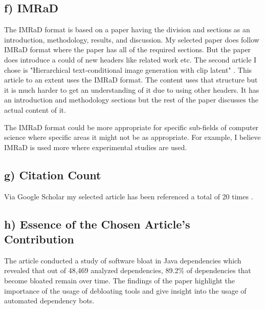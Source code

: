 \documentclass{article}
\begin{document}
\subsection*{f) IMRaD }

The IMRaD format is based on a paper having the division and sections as an introduction, methodology, results, and discussion. My selected paper does follow IMRaD format where the paper has all of the required sections. But the paper does introduce a could of new headers like related work etc. The second article I chose is "Hierarchical text-conditional image generation with clip latent" \cite{ramesh2022hierarchical}. This article to an extent uses the IMRaD format. The content uses that structure but it is much harder to get an understanding of it due to using other headers. It has an introduction and methodology sections but the rest of the paper discusses the actual content of it.

The IMRaD format could be more appropriate for specific sub-fields of computer science where specific areas it might not be as appropriate. For example, I believe IMRaD is used more where experimental studies are used.

\subsection*{g) Citation Count}
Via Google Scholar my selected article has been referenced a total of 20 times \cite{GoogleScholar2023}. 

\subsection*{h) Essence of the Chosen Article's Contribution}

The article conducted a study of software bloat in Java dependencies which revealed that out of 48,469 analyzed dependencies, 89.2\% of dependencies that become bloated remain over time. The findings of the paper highlight the importance of the usage of debloating tools and give insight into the usage of automated dependency bots.

\hspace{0cm}
\newpage



\end{document}
